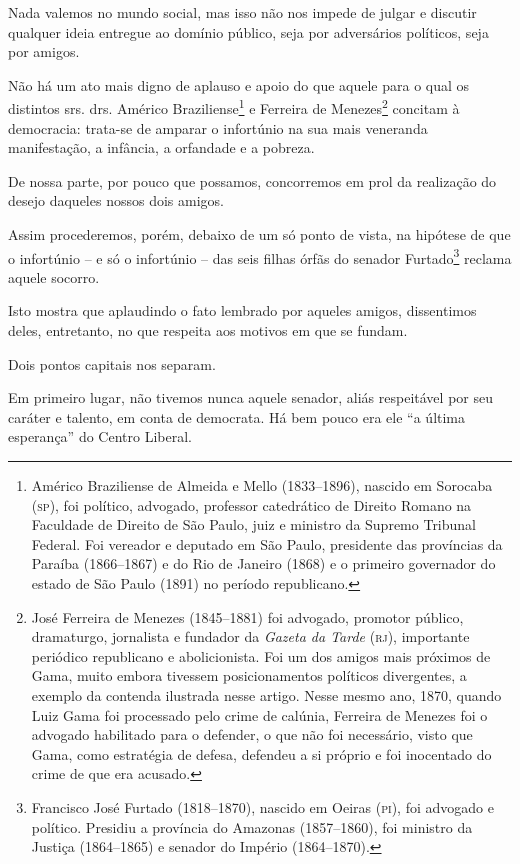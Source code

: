 {Nada valemos no mundo social, mas isso não nos impede de julgar e
discutir qualquer ideia entregue ao domínio público, seja por
adversários políticos, seja por amigos.

Não há um ato mais digno de aplauso e apoio do que aquele para o qual os
distintos srs. drs. Américo Braziliense\footnote{ Américo Braziliense
  de Almeida e Mello (1833--1896), nascido em Sorocaba (\textsc{sp}), foi
  político, advogado, professor catedrático de Direito Romano na
  Faculdade de Direito de São Paulo, juiz e ministro da Supremo Tribunal
  Federal. Foi vereador e deputado em São Paulo, presidente das
  províncias da Paraíba (1866--1867) e do Rio de Janeiro (1868) e o
  primeiro governador do estado de São Paulo (1891) no período
  republicano.} e Ferreira de Menezes\footnote{ José Ferreira de
  Menezes (1845--1881) foi advogado, promotor público, dramaturgo,
  jornalista e fundador da \emph{Gazeta da Tarde} (\textsc{rj}), importante
  periódico republicano e abolicionista. Foi um dos amigos mais próximos
  de Gama, muito embora tivessem posicionamentos políticos divergentes,
  a exemplo da contenda ilustrada nesse artigo. Nesse mesmo ano, 1870,
  quando Luiz Gama foi processado pelo crime de calúnia, Ferreira de
  Menezes foi o advogado habilitado para o defender, o que não foi
  necessário, visto que Gama, como estratégia de defesa, defendeu a si
  próprio e foi inocentado do crime de que era acusado.} concitam à
democracia: trata-se de amparar o infortúnio na sua mais veneranda
manifestação, a infância, a orfandade e a pobreza.

De nossa parte, por pouco que possamos, concorremos em prol da
realização do desejo daqueles nossos dois amigos.

Assim procederemos, porém, debaixo de um só ponto de vista, na hipótese
de que o infortúnio -- e só o infortúnio -- das seis filhas órfãs do
senador Furtado\footnote{ Francisco José Furtado (1818--1870), nascido
  em Oeiras (\textsc{pi}), foi advogado e político. Presidiu a província do
  Amazonas (1857--1860), foi ministro da Justiça (1864--1865) e senador do
  Império (1864--1870).} reclama aquele socorro.

Isto mostra que aplaudindo o fato lembrado por aqueles amigos,
dissentimos deles, entretanto, no que respeita aos motivos em que se
fundam.

Dois pontos capitais nos separam.

Em primeiro lugar, não tivemos nunca aquele senador, aliás respeitável
por seu caráter e talento, em conta de democrata. Há bem pouco era ele
``a última esperança'' do Centro Liberal.

}
